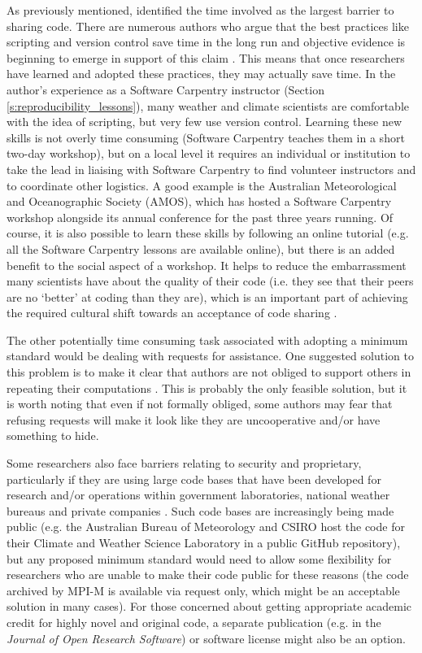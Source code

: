 As previously mentioned, \citet{Stodden2010} identified the time involved as the largest barrier to sharing code. There are numerous authors who argue that the best practices like scripting and version control save time in the long run \citep[e.g.][]{Sandve2013,Wilson2014a} and objective evidence is beginning to emerge in support of this claim \citep{Simperler2015}. This means that once researchers have learned and adopted these practices, they may actually save time. In the author's experience as a Software Carpentry instructor (Section \ref{s:reproducibility_lessons}), many weather and climate scientists are comfortable with the idea of scripting, but very few use version control. Learning these new skills is not overly time consuming (Software Carpentry teaches them in a short two-day workshop), but on a local level it requires an individual or institution to take the lead in liaising with Software Carpentry to find volunteer instructors and to coordinate other logistics. A good example is the Australian Meteorological and Oceanographic Society (AMOS), which has hosted a Software Carpentry workshop alongside its annual conference for the past three years running. Of course, it is also possible to learn these skills by following an online tutorial (e.g. all the Software Carpentry lessons are available online), but there is an added benefit to the social aspect of a workshop. It helps to reduce the embarrassment many scientists have about the quality of their code (i.e. they see that their peers are no `better' at coding than they are), which is an important part of achieving the required cultural shift towards an acceptance of code sharing \citep{Barnes2010}.

The other potentially time consuming task associated with adopting a minimum standard would be dealing with requests for assistance. One suggested solution to this problem is to make it clear that authors are not obliged to support others in repeating their computations \citep{Easterbrook2014}. This is probably the only feasible solution, but it is worth noting that even if not formally obliged, some authors may fear that refusing requests will make it look like they are uncooperative and/or have something to hide. 

Some researchers also face barriers relating to security and proprietary, particularly if they are using large code bases that have been developed for research and/or operations within government laboratories, national weather bureaus and private companies \citep{Stodden2010}. Such code bases are increasingly being made public (e.g. the Australian Bureau of Meteorology and CSIRO host the code for their Climate and Weather Science Laboratory in a public GitHub repository), but any proposed minimum standard would need to allow some flexibility for researchers who are unable to make their code public for these reasons (the code archived by MPI-M is available via request only, which might be an acceptable solution in many cases). For those concerned about getting appropriate academic credit for highly novel and original code, a separate publication (e.g. in the \textit{Journal of Open Research Software}) or software license \citep[e.g.][]{Morin2012} might also be an option.

